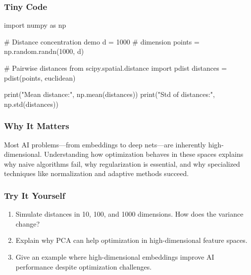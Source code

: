 \documentclass[
  letterpaper,
  DIV=11,
  numbers=noendperiod]{scrreprt}
\newenvironment{Shaded}{\begin{snugshade}}{\end{snugshade}}
\newcommand{\BuiltInTok}[1]{\textcolor[rgb]{0.00,0.23,0.31}{#1}}
\newcommand{\CommentTok}[1]{\textcolor[rgb]{0.37,0.37,0.37}{#1}}
\newcommand{\DecValTok}[1]{\textcolor[rgb]{0.68,0.00,0.00}{#1}}
\newcommand{\ImportTok}[1]{\textcolor[rgb]{0.00,0.46,0.62}{#1}}
\newcommand{\NormalTok}[1]{\textcolor[rgb]{0.00,0.23,0.31}{#1}}
\newcommand{\OperatorTok}[1]{\textcolor[rgb]{0.37,0.37,0.37}{#1}}
\newcommand{\StringTok}[1]{\textcolor[rgb]{0.13,0.47,0.30}{#1}}
\providecommand{\tightlist}{%
  \setlength{\itemsep}{0pt}\setlength{\parskip}{0pt}}
\begin{document}
\subsubsection{Tiny Code}\label{tiny-code-148}

\begin{Shaded}
\begin{Highlighting}[]
\ImportTok{import}\NormalTok{ numpy }\ImportTok{as}\NormalTok{ np}

\CommentTok{\# Distance concentration demo}
\NormalTok{d }\OperatorTok{=} \DecValTok{1000}  \CommentTok{\# dimension}
\NormalTok{points }\OperatorTok{=}\NormalTok{ np.random.randn(}\DecValTok{1000}\NormalTok{, d)}

\CommentTok{\# Pairwise distances}
\ImportTok{from}\NormalTok{ scipy.spatial.distance }\ImportTok{import}\NormalTok{ pdist}
\NormalTok{distances }\OperatorTok{=}\NormalTok{ pdist(points, }\StringTok{\textquotesingle{}euclidean\textquotesingle{}}\NormalTok{)}

\BuiltInTok{print}\NormalTok{(}\StringTok{"Mean distance:"}\NormalTok{, np.mean(distances))}
\BuiltInTok{print}\NormalTok{(}\StringTok{"Std of distances:"}\NormalTok{, np.std(distances))}
\end{Highlighting}
\end{Shaded}

\subsubsection{Why It Matters}\label{why-it-matters-46}

Most AI problems---from embeddings to deep nets---are inherently
high-dimensional. Understanding how optimization behaves in these spaces
explains why naive algorithms fail, why regularization is essential, and
why specialized techniques like normalization and adaptive methods
succeed.

\subsubsection{Try It Yourself}\label{try-it-yourself-148}

\begin{enumerate}
\def\labelenumi{\arabic{enumi}.}
\tightlist
\item
  Simulate distances in 10, 100, and 1000 dimensions. How does the
  variance change?
\item
  Explain why PCA can help optimization in high-dimensional feature
  spaces.
\item
  Give an example where high-dimensional embeddings improve AI
  performance despite optimization challenges.
\end{enumerate}
\end{document}
